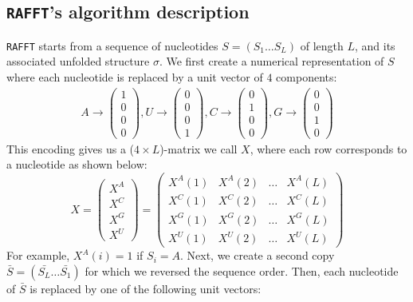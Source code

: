 \subsection{\texttt{RAFFT}'s  algorithm description}
\texttt{RAFFT} starts from a sequence of nucleotides \(S=(S_1\dots S_L)\) of length \(L\), and its associated unfolded structure $\sigma$. We first create a numerical representation of \(S\) where each nucleotide is replaced by a unit vector of $4$ components:
\begin{equation}
\begin{split}
A \rightarrow \begin{pmatrix} 1\\ 0\\ 0\\ 0 \end{pmatrix},
U \rightarrow \begin{pmatrix} 0\\ 0\\ 0\\ 1 \end{pmatrix},
C \rightarrow \begin{pmatrix} 0\\ 1\\ 0\\ 0 \end{pmatrix},
G \rightarrow \begin{pmatrix} 0\\ 0\\ 1\\ 0 \end{pmatrix}
\end{split}
\end{equation}
This encoding gives us a (\(4 \times L\))-matrix we call \(X\), where each row corresponds to a nucleotide as shown below:
\begin{equation}
X = \begin{pmatrix} X^A\\ X^C\\ X^G\\ X^U \end{pmatrix} = \begin{pmatrix} X^A(1) &X^A(2) &\dots &X^A(L) \\ X^C(1) &X^C(2) &\dots &X^C(L)\\ X^G(1) &X^G(2) &\dots &X^G(L)\\ X^U(1) &X^U(2) &\dots &X^U(L) \end{pmatrix}
\end{equation}
For example, \(X^A(i) = 1\) if \(S_i = A\). Next, we create a second copy \(\bar{S}=(\bar{S_L}\dots \bar{S_1})\) for which we reversed the sequence order. Then, each nucleotide of \(\bar{S}\) is replaced by one of the following unit vectors:
